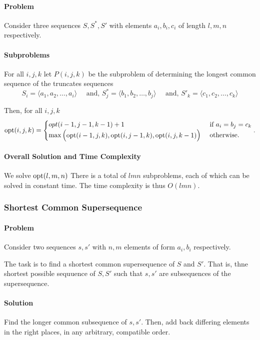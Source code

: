 \paragraph{Problem}
Consider three sequences \(S, S^*, S'\) with elements  \(a_i, b_i, c_i\)
of length  \(l, m, n\) respectively.

\paragraph{Subproblems}
For all \(i, j, k\) let  \(P(i, j, k)\) be the subproblem of determining
the longest common sequence of the truncates sequences \[
  S_i = \langle a_1, a_2, \ldots, a_i \rangle
  \quad \text{ and, }
  S^*_j = \langle b_1, b_2, \ldots, b_j \rangle
  \quad \text{ and, }
  S'_k = \langle c_1, c_2, \ldots, c_k \rangle
\]

Then, for all \(i, j, k\)  \[
  \mathrm{opt}(i, j, k) = \begin{cases}
    opt(i - 1, j - 1, k - 1) + 1 & \text{ if } a_i = b_j = c_k \\
    \max \begin{pmatrix} 
      \mathrm{opt}(i - 1, j, k),
      \mathrm{opt}(i, j - 1, k),
      \mathrm{opt}(i, j, k - 1)
    \end{pmatrix}  & \text{ otherwise}.
  \end{cases}
.\] 

\paragraph{Overall Solution and Time Complexity}
We solve \(\mathrm{opt}(l, m, n)\)
There is a total of \(lmn\) subproblems, each of which can be solved in constant time.
The time complexity is thus \(O(lmn)\).

\subsubsection{Shortest Common Supersequence}

\paragraph{Problem}
Consider two sequences \(s, s'\) with \(n, m\) elements of form  \(a_i, b_i\) 
respectively.

The task is to find a shortest common supersequence of \(S\) and \(S'\).
That is, thne shortest possible sequuence of \(S, S'\)
such that \(s, s'\) are subsequences of the supersequence.

\paragraph{Solution}
Find the longer common subsequence of \(s, s'\).
Then, add back differing elements in the right places, in any arbitrary,
compatible order.

